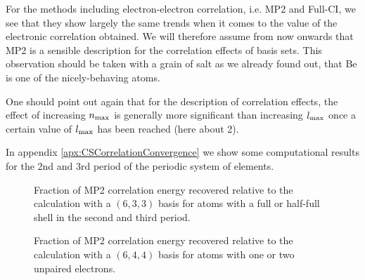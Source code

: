 For the methods including electron-electron correlation,
i.e. MP2 and Full-CI,
we see that they show largely the same trends
when it comes to the value of the electronic correlation obtained.
We will therefore assume from now onwards
that MP2 is a sensible description
for the correlation effects of \CS basis sets.
This observation should be taken with a grain
of salt
as we already found out,
that Be is one of the nicely-behaving atoms.

One should point out again that for the description
of correlation effects, the effect of increasing $n_\text{max}$
is generally more significant than increasing
$l_\text{max}$ once a certain value of $l_\text{max}$ has been reached
(here about 2).

In appendix \vref{apx:CSCorrelationConvergence} we show
some computational results for the 2nd and 3rd
period of the periodic system of elements.


\begin{figure}
	\centering
	\caption{Fraction of MP2 correlation energy recovered
		relative to the calculation with a $(6,3,3)$ \CS basis for
		atoms with a full or half-full shell in the second and third period.}
	\label{fig:EccVsNlmEasy}
\end{figure}

\begin{figure}
	\centering
	\caption{Fraction of MP2 correlation energy recovered
		relative to the calculation with a $(6,4,4)$ \CS basis for
		atoms with one or two unpaired electrons.}
	\label{fig:EccVsNlmHard}
\end{figure}

